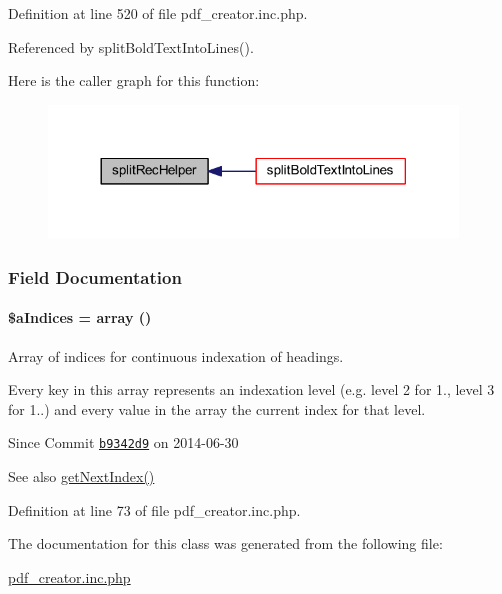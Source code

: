 Definition at line 520 of file pdf\+\_\+creator.\+inc.\+php.



Referenced by split\+Bold\+Text\+Into\+Lines().



Here is the caller graph for this function\+:
\nopagebreak
\begin{figure}[H]
\begin{center}
\leavevmode
\includegraphics[width=308pt]{classoverview_p_d_f_af3f9a49de14251ba45bd046879f27aa2_icgraph}
\end{center}
\end{figure}




\subsubsection{Field Documentation}
\hypertarget{classoverview_p_d_f_a7d055132da646af2b192923c6a864e97}{
\paragraph[{\$a\+Indices}]{\setlength{\rightskip}{0pt plus 5cm}\$a\+Indices = array ()\hspace{0.3cm}{\ttfamily [private]}}}\label{classoverview_p_d_f_a7d055132da646af2b192923c6a864e97}


Array of indices for continuous indexation of headings. 

Every key in this array represents an indexation level (e.\+g. level 2 for 1., level 3 for 1..) and every value in the array the current index for that level.

\begin{DoxySince}{Since}
Commit \href{http://github.com/TheJake123/DrupalModul/commit/b9342d941b3f93e212f3f6af0823a07524dd5954}{\tt b9342d9} on 2014-\/06-\/30 
\end{DoxySince}
\begin{DoxySeeAlso}{See also}
\hyperlink{classoverview_p_d_f_aedc9466cae51e07e57ba865a69c92efc}{get\+Next\+Index()} 
\end{DoxySeeAlso}


Definition at line 73 of file pdf\+\_\+creator.\+inc.\+php.



The documentation for this class was generated from the following file\+:\begin{DoxyCompactItemize}
\item 
\hyperlink{pdf__creator_8inc_8php}{pdf\+\_\+creator.\+inc.\+php}\end{DoxyCompactItemize}
